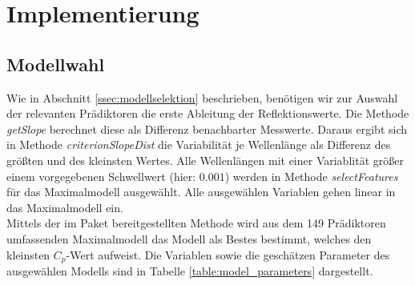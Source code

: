 \section{Implementierung}
\label{sec:implementation}
\subsection{Modellwahl}
\label{ssec:impl:modelwahl}

Wie in Abschnitt \ref{ssec:modellselektion} beschrieben, benötigen wir zur Auswahl der relevanten Prädiktoren die erste Ableitung der Reflektionswerte. Die Methode \textit{getSlope} berechnet diese als Differenz benachbarter Messwerte. Daraus ergibt sich in Methode \textit{criterionSlopeDist} die Variabilität je Wellenlänge als Differenz des größten und des kleinsten Wertes. Alle Wellenlängen mit einer Variablität größer einem vorgegebenen Schwellwert (hier: $0.001$) werden in Methode \textit{selectFeatures} für das Maximalmodell ausgewählt. Alle ausgewählen Variablen gehen linear in das Maximalmodell ein.\\
Mittels der im Paket  bereitgestellten Methode  wird aus dem 149 Prädiktoren umfassenden Maximalmodell das Modell als Bestes bestimmt, welches den kleinsten $C_p$-Wert aufweist. 
Die Variablen sowie die geschätzen Parameter des ausgewählen Modells sind in Tabelle \ref{table:model_parameters} dargestellt.\\

